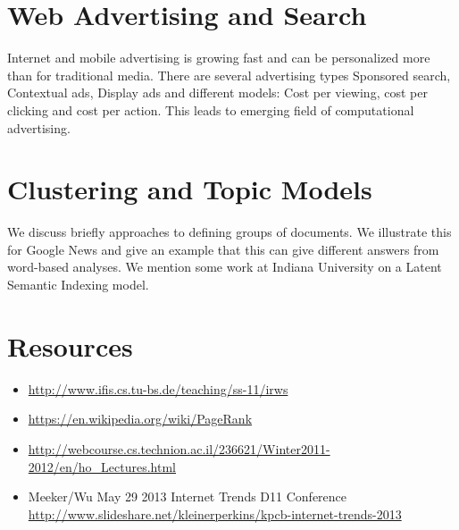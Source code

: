 \section{Web Advertising and
Search}\label{web-advertising-and-search}


Internet and mobile advertising is growing fast and can be personalized
more than for traditional media. There are several advertising types
Sponsored search, Contextual ads, Display ads and different models: Cost
per viewing, cost per clicking and cost per action. This leads to
emerging field of computational advertising.




\section{Clustering and Topic Models}\label{clustering-and-topic-models}


We discuss briefly approaches to defining groups of documents. We
illustrate this for Google News and give an example that this can give
different answers from word-based analyses. We mention some work at
Indiana University on a Latent Semantic Indexing model.


\section{Resources}\label{resources-1}

\begin{itemize}
\item
  \url{http://www.ifis.cs.tu-bs.de/teaching/ss-11/irws}
\item
  \url{https://en.wikipedia.org/wiki/PageRank}
\item
  \url{http://webcourse.cs.technion.ac.il/236621/Winter2011-2012/en/ho_Lectures.html}
\item
  Meeker/Wu May 29 2013 Internet Trends D11 Conference
  \url{http://www.slideshare.net/kleinerperkins/kpcb-internet-trends-2013}
\end{itemize}
